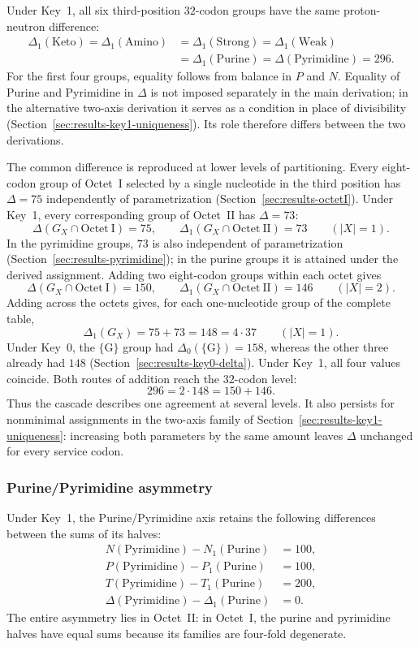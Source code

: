\documentclass[11pt,a4paper]{article}
\renewcommand{\_}{\origunderscore\allowbreak}
\begin{document}
Under Key~1, all six third-position $32$-codon groups
have the same proton-neutron difference:
\[
\begin{aligned}
\Delta_1(\mathrm{Keto})=\Delta_1(\mathrm{Amino})
&=\Delta_1(\mathrm{Strong})=\Delta_1(\mathrm{Weak})\\
&=\Delta_1(\mathrm{Purine})=\Delta(\mathrm{Pyrimidine})=296.
\end{aligned}
\]
For the first four groups, equality follows from balance
in $P$ and $N$. Equality of Purine and Pyrimidine in
$\Delta$ is not imposed separately in the main
derivation; in the alternative two-axis derivation it
serves as a condition in place of divisibility
(Section~\ref{sec:results-key1-uniqueness}). Its role
therefore differs between the two derivations.

The common difference is reproduced at lower levels
of partitioning. Every eight-codon group of Octet~I
selected by a single nucleotide in the third position
has $\Delta=75$ independently of parametrization
(Section~\ref{sec:results-octetI}). Under Key~1, every
corresponding group of Octet~II has $\Delta=73$:
\[
\Delta(G_X\cap\mathrm{Octet~I})=75,\qquad
\Delta_1(G_X\cap\mathrm{Octet~II})=73
\qquad (|X|=1).
\]
In the pyrimidine groups, $73$ is also independent of
parametrization (Section~\ref{sec:results-pyrimidine});
in the purine groups it is attained under the derived
assignment. Adding two eight-codon groups within each
octet gives
\[
\Delta(G_X\cap\mathrm{Octet~I})=150,\qquad
\Delta_1(G_X\cap\mathrm{Octet~II})=146
\qquad (|X|=2).
\]
Adding across the octets gives, for each one-nucleotide
group of the complete table,
\[
\Delta_1(G_X)=75+73=148=4\cdot37
\qquad (|X|=1).
\]
Under Key~0, the $\{\mathrm{G}\}$ group had
$\Delta_0(\{\mathrm{G}\})=158$, whereas the other
three already had $148$
(Section~\ref{sec:results-key0-delta}). Under Key~1,
all four values coincide. Both routes of addition
reach the $32$-codon level:
\[
296=2\cdot148=150+146.
\]
Thus the cascade describes one agreement at several
levels. It also persists for nonminimal assignments
in the two-axis family of
Section~\ref{sec:results-key1-uniqueness}: increasing
both parameters by the same amount leaves $\Delta$
unchanged for every service codon.

\subsubsection{Purine/Pyrimidine asymmetry}
\label{sec:results-key1-purpyr}

Under Key~1, the Purine/Pyrimidine axis retains the
following differences between the sums of its halves:
\begin{align*}
N(\mathrm{Pyrimidine})-N_1(\mathrm{Purine})&=100,\\
P(\mathrm{Pyrimidine})-P_1(\mathrm{Purine})&=100,\\
T(\mathrm{Pyrimidine})-T_1(\mathrm{Purine})&=200,\\
\Delta(\mathrm{Pyrimidine})-\Delta_1(\mathrm{Purine})&=0.
\end{align*}
The entire asymmetry lies in Octet~II: in Octet~I,
the purine and pyrimidine halves have equal sums
because its families are four-fold degenerate.
\end{document}
